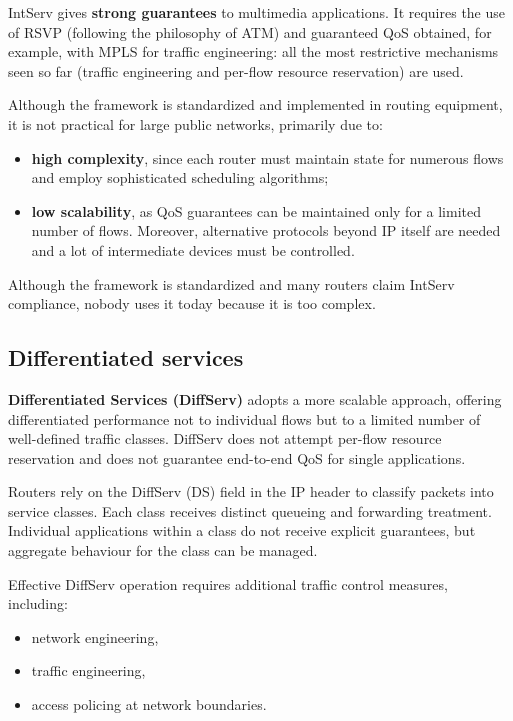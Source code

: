 \documentclass[11pt,a4paper,openany]{report}
\begin{document}
IntServ gives \textbf{strong guarantees} to multimedia applications. It requires the use of RSVP (following the philosophy of ATM) and guaranteed QoS obtained, for example, with MPLS for traffic engineering: all the most restrictive mechanisms seen so far (traffic engineering and per-flow resource reservation) are used.

Although the framework is standardized and implemented in routing equipment, it is not practical for large public networks, primarily due to:

\begin{itemize}
\item \textbf{high complexity}, since each router must maintain state for numerous flows and employ sophisticated scheduling algorithms;
\item \textbf{low scalability}, as QoS guarantees can be maintained only for a limited number of flows. Moreover, alternative protocols beyond IP itself are needed and a lot of intermediate devices must be controlled.
\end{itemize}

Although the framework is standardized and many routers claim IntServ compliance, nobody uses it today because it is too complex.

\subsection{Differentiated services}

\textbf{Differentiated Services (DiffServ)} adopts a more scalable approach, offering differentiated performance not to individual flows but to a limited number of well-defined traffic classes. DiffServ does not attempt per-flow resource reservation and does not guarantee end-to-end QoS for single applications.

Routers rely on the DiffServ (DS) field in the IP header to classify packets into service classes. Each class receives distinct queueing and forwarding treatment. Individual applications within a class do not receive explicit guarantees, but aggregate behaviour for the class can be managed.

Effective DiffServ operation requires additional traffic control measures, including:

\begin{itemize}
\item network engineering,
\item traffic engineering,
\item access policing at network boundaries.
\end{itemize}
\end{document}
